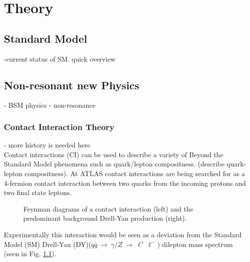 \chapter{Theory}

\section{Standard Model}
-current status of SM. quick overview

\section{Non-resonant new Physics}
- BSM physics
- non-resonance

\newpage
\subsection{Contact Interaction Theory}

- more history is needed here\\

Contact interactions (CI) can be used to describe a variety of Beyond the Standard Model phenomena such as quark/lepton compositness. (describe quark-lepton compositness). At ATLAS contact interactions are being searched for as a 4-fermion contact interaction between two quarks from the incoming protons and two final state leptons.

\begin{figure}[h]
\begin{center}
\end{center}
\caption{Feynman diagrams of a contact interaction (left) and the predominant background Drell-Yan production (right).}
\label{fig:fd}
\end{figure}

Experimentally this interaction would be seen as a deviation from the Standard Model (SM) Drell-Yan (DY)($q\bar{q}~\rightarrow~\gamma/Z~\rightarrow~\ell^{+}\ell^{-}$) dilepton mass spectrum (seen in Fig. \ref{fig:fd}). 

